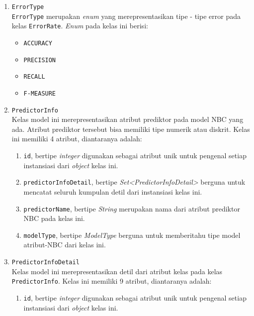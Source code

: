 \begin{enumerate}
\begin{enumerate}
		
	\end{enumerate}

	\item \texttt{ErrorType}\\
	\texttt{ErrorType} merupakan \textit{enum} yang merepresentasikan tipe - tipe error pada kelas \texttt{ErrorRate}. \textit{Enum} pada kelas ini berisi:
	\begin{itemize}
		\item \texttt{ACCURACY}
		\item \texttt{PRECISION}
		\item \texttt{RECALL}
		\item \texttt{F-MEASURE}
	\end{itemize}	 

	\item \texttt{PredictorInfo}\\
	Kelas model ini merepresentasikan atribut prediktor pada model NBC yang ada. Atribut prediktor tersebut bisa memiliki tipe numerik atau diskrit. Kelas ini memiliki 4 atribut, diantaranya adalah:
	\begin{enumerate}
		\item \texttt{id}, bertipe \textit{integer} digunakan sebagai atribut unik untuk pengenal setiap instansiasi dari \textit{object} kelas ini.
		
		\item \texttt{predictorInfoDetail}, bertipe \textit{Set<PredictorInfoDetail>} berguna untuk mencatat seluruh kumpulan detil dari instansiasi kelas ini.

		\item \texttt{predictorName}, bertipe \textit{String} merupakan nama dari atribut prediktor NBC pada kelas ini.
		
		\item \texttt{modelType}, bertipe \textit{ModelType} berguna untuk memberitahu tipe model atribut-NBC dari kelas ini.
		
				
	\end{enumerate}

	\item \texttt{PredictorInfoDetail}\\
	Kelas model ini merepresentasikan detil dari atribut kelas pada kelas \texttt{PredictorInfo}. Kelas ini memiliki 9 atribut, diantaranya adalah:
	\begin{enumerate}
		\item \texttt{id}, bertipe \textit{integer} digunakan sebagai atribut unik untuk pengenal setiap instansiasi dari \textit{object} kelas ini.
		

\end{enumerate}
\end{enumerate}
